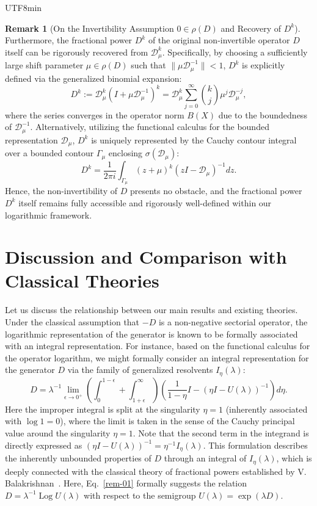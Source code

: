 \documentclass[10pt,a4paper]{article}
\theoremstyle{definition}
\newtheorem{remark}[theorem]{Remark}
\theoremstyle{remark}
\begin{document}
\begin{CJK}{UTF8}{min}
\begin{remark}[On the Invertibility Assumption $0 \in \rho(D)$ and Recovery of $D^k$]
Furthermore, the fractional power $D^k$ of the original non-invertible operator $D$ itself can be rigorously recovered from $\mathcal{D}_\mu^k$. 
Specifically, by choosing a sufficiently large shift parameter $\mu \in \rho(D)$ such that $\|\mu \mathcal{D}_\mu^{-1}\| < 1$, $D^k$ is explicitly defined via the generalized binomial expansion:
\begin{equation} \label{eq-recov}
D^k := \mathcal{D}_\mu^k \left( I + \mu \mathcal{D}_\mu^{-1} \right)^k = \mathcal{D}_\mu^k \sum_{j=0}^{\infty} \binom{k}{j} \mu^j \mathcal{D}_\mu^{-j},
\end{equation}
where the series converges in the operator norm $B(X)$ due to the boundedness of $\mathcal{D}_\mu^{-1}$. 
Alternatively, utilizing the functional calculus for the bounded representation $\mathcal{D}_\mu$, $D^k$ is uniquely represented by the Cauchy contour integral over a bounded contour $\Gamma_\mu$ enclosing $\sigma(\mathcal{D}_\mu)$:
\begin{equation}
D^k = \frac{1}{2\pi i} \int_{\Gamma_\mu} (z + \mu)^k (z I - \mathcal{D}_\mu)^{-1} dz.
\end{equation}
Hence, the non-invertibility of $D$ presents no obstacle, and the fractional power $D^k$ itself remains fully accessible and rigorously well-defined within our logarithmic framework.
\end{remark}


\section{Discussion and Comparison with Classical Theories}
Let us discuss the relationship between our main results and existing theories. 
Under the classical assumption that $-D$ is a non-negative sectorial operator, the logarithmic representation of the generator is known to be formally associated with an integral representation.
For instance, based on the functional calculus for the operator logarithm, we might formally consider an integral representation for the generator $D$ via the family of generalized resolvents $I_\eta(\lambda)$:
\begin{equation} \label{rem-01}
D = \lambda^{-1} \lim_{\epsilon \to 0^+} \left( \int_{0}^{1-\epsilon} + \int_{1+\epsilon}^{\infty} \right) \left( \frac{1}{1 - \eta} I - (\eta I - U(\lambda))^{-1} \right) d\eta.
\end{equation}
Here the improper integral is split at the singularity $\eta = 1$ (inherently associated with $\log 1 = 0$), where the limit is taken in the sense of the Cauchy principal value around the singularity $\eta = 1$.
Note that the second term in the integrand is directly expressed as $(\eta I - U(\lambda))^{-1} = \eta^{-1} I_\eta(\lambda)$. 
This formulation describes the inherently unbounded properties of $D$ through an integral of $I_\eta(\lambda)$, which is deeply connected with the classical theory of fractional powers established by V. Balakrishnan~\cite{60Balakrishnan}.
Here, Eq.~\eqref{rem-01} formally suggests the relation $D = \lambda^{-1} \operatorname{Log} U(\lambda)$ with respect to the semigroup $U(\lambda) = \exp(\lambda D)$.


\end{CJK}
\end{document}
